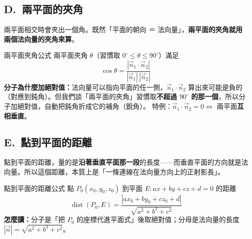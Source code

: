 \documentclass[11pt]{article}
\begin{document}
\subsection*{\sffamily D.\ 兩平面的夾角}

兩平面相交時會夾出一個角。既然「平面的朝向 ＝ 法向量」，\textbf{兩平面的夾角就用兩個法向量的夾角來算}。


\begin{補充框}{兩平面夾角公式}
兩平面夾角 $\theta$（習慣取 $0^\circ\le\theta\le 90^\circ$）滿足
$$\boxed{\;\cos\theta=\frac{|\vec n_1\cdot\vec n_2|}{|\vec n_1|\,|\vec n_2|}\;}$$
\textbf{分子為什麼加絕對值：}法向量可以指向平面的任一側，$\vec n_1\cdot\vec n_2$ 算出來可能是負的（對應到鈍角）。但我們談「兩平面的夾角」習慣取\textbf{不超過 $90^\circ$ 的那一個}，所以分子加絕對值，自動把鈍角折成它的補角（銳角）。
特例：$\vec n_1\cdot\vec n_2=0\iff$ 兩平面\textbf{互相垂直}。
\end{補充框}

\subsection*{\sffamily E.\ 點到平面的距離}

點到平面的距離，量的是\textbf{沿著垂直平面那一段}的長度——而垂直平面的方向就是法向量。所以這個距離，本質上是「一條連線在法向量方向上的正射影長」。


\begin{補充框}{點到平面的距離公式}
點 $P_0(x_0,y_0,z_0)$ 到平面 $E:ax+by+cz+d=0$ 的距離
$$\boxed{\;\operatorname{dist}(P_0,E)=\frac{|ax_0+by_0+cz_0+d|}{\sqrt{a^2+b^2+c^2}}\;}$$
\textbf{怎麼讀：}分子是「把 $P_0$ 的座標代進平面式」後取絕對值；分母是法向量的長度 $|\vec n|=\sqrt{a^2+b^2+c^2}$。
\end{補充框}
\end{document}
